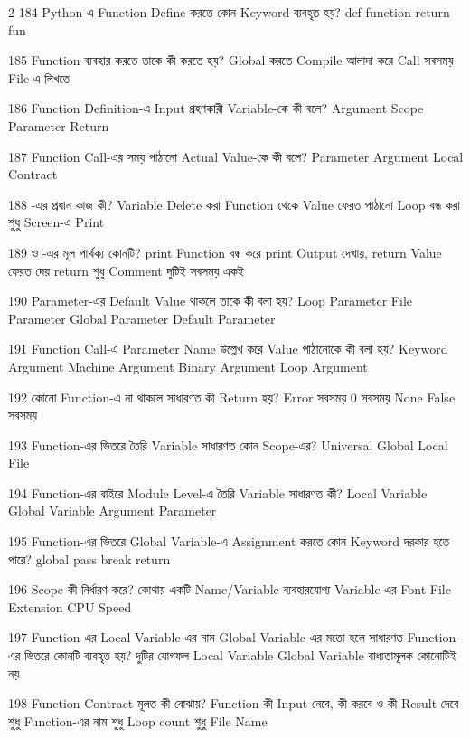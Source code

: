 \begin{multicols}{2}
\mcq
{184}
{Python-এ Function Define করতে কোন Keyword ব্যবহৃত হয়?}
{def}
{function}
{return}
{fun}

\mcq
{185}
{Function ব্যবহার করতে তাকে কী করতে হয়?}
{Global করতে}
{Compile আলাদা করে}
{Call}
{সবসময় File-এ লিখতে}

\mcq
{186}
{Function Definition-এ Input গ্রহণকারী Variable-কে কী বলে?}
{Argument}
{Scope}
{Parameter}
{Return}

\mcq
{187}
{Function Call-এর সময় পাঠানো Actual Value-কে কী বলে?}
{Parameter}
{Argument}
{Local}
{Contract}

\mcqwide
{188}
{-এর প্রধান কাজ কী?}
{Variable Delete করা}
{Function থেকে Value ফেরত পাঠানো}
{Loop বন্ধ করা}
{শুধু Screen-এ Print}

\mcqwide
{189}
{ ও -এর মূল পার্থক্য কোনটি?}
{print Function বন্ধ করে}
{print Output দেখায়, return Value ফেরত দেয়}
{return শুধু Comment}
{দুটিই সবসময় একই}

\mcq
{190}
{Parameter-এর Default Value থাকলে তাকে কী বলা হয়?}
{Loop Parameter}
{File Parameter}
{Global Parameter}
{Default Parameter}

\mcq
{191}
{Function Call-এ Parameter Name উল্লেখ করে Value পাঠানোকে কী বলা হয়?}
{Keyword Argument}
{Machine Argument}
{Binary Argument}
{Loop Argument}

\mcq
{192}
{কোনো Function-এ  না থাকলে সাধারণত কী Return হয়?}
{Error সবসময়}
{0 সবসময়}
{None}
{False সবসময়}

\mcq
{193}
{Function-এর ভিতরে তৈরি Variable সাধারণত কোন Scope-এর?}
{Universal}
{Global}
{Local}
{File}

\mcq
{194}
{Function-এর বাইরে Module Level-এ তৈরি Variable সাধারণত কী?}
{Local Variable}
{Global Variable}
{Argument}
{Parameter}

\mcq
{195}
{Function-এর ভিতরে Global Variable-এ Assignment করতে কোন Keyword দরকার হতে পারে?}
{global}
{pass}
{break}
{return}

\mcqwide
{196}
{Scope কী নির্ধারণ করে?}
{কোথায় একটি Name/Variable ব্যবহারযোগ্য}
{Variable-এর Font}
{File Extension}
{CPU Speed}

\mcq
{197}
{Function-এর Local Variable-এর নাম Global Variable-এর মতো হলে সাধারণত Function-এর ভিতরে কোনটি ব্যবহৃত হয়?}
{দুটির যোগফল}
{Local Variable}
{Global Variable বাধ্যতামূলক}
{কোনোটিই নয়}

\mcqwide
{198}
{Function Contract মূলত কী বোঝায়?}
{Function কী Input নেবে, কী করবে ও কী Result দেবে}
{শুধু Function-এর নাম}
{শুধু Loop count}
{শুধু File Name}


\end{multicols}
